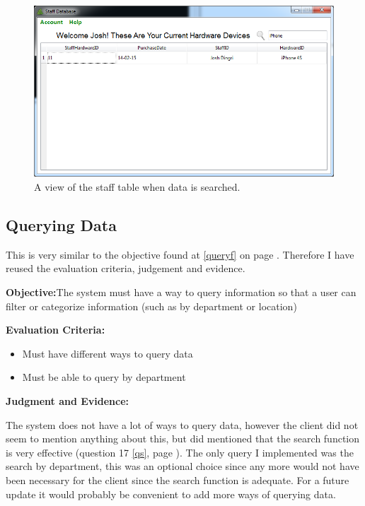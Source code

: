 \begin{figure}[H]
    \includegraphics[width=\textwidth]{./Evaluation/Images/staffsearch.png}
    \caption{A view of the staff table when data is searched.} 
\end{figure}


\subsection{Querying Data}

This is very similar to the objective found at \ref{queryf} on page \pageref{queryf}. Therefore I have reused the evaluation criteria, judgement and evidence.

\textbf{Objective:}The system must have a way to query information so that a user can filter or categorize information (such as by department or location)

\textbf{Evaluation Criteria:}
\begin{itemize}
\item{Must have different ways to query data}
\item{Must be able to query by department}
\end{itemize}

\textbf{Judgment and Evidence:}

The system does not have a lot of ways to query data, however the client did not seem to mention anything about this, but did mentioned that the search function is very effective (question 17 \ref{qs}, page \pageref{qs}). The only query I implemented was the search by department, this was an optional choice since any more would not have been necessary for the client since the search function is adequate. For a future update it would probably be convenient to add more ways of querying data.

